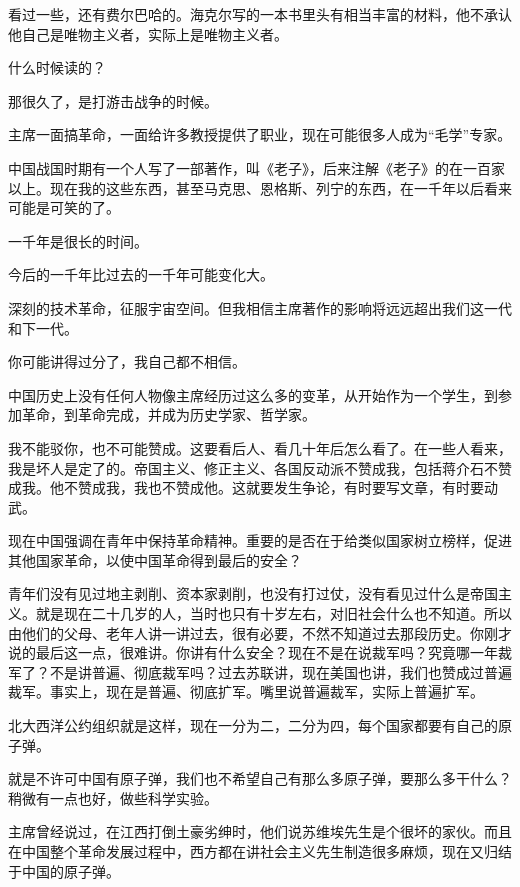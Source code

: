 看过一些，还有费尔巴哈的。海克尔写的一本书里头有相当丰富的材料，他不承认他自己是唯物主义者，实际上是唯物主义者。

什么时候读的？

那很久了，是打游击战争的时候。

主席一面搞革命，一面给许多教授提供了职业，现在可能很多人成为“毛学”专家。

中国战国时期有一个人写了一部著作，叫《老子》，后来注解《老子》的在一百家以上。现在我的这些东西，甚至马克思、恩格斯、列宁的东西，在一千年以后看来可能是可笑的了。

一千年是很长的时间。

今后的一千年比过去的一千年可能变化大。

深刻的技术革命，征服宇宙空间。但我相信主席著作的影响将远远超出我们这一代和下一代。

你可能讲得过分了，我自己都不相信。

中国历史上没有任何人物像主席经历过这么多的变革，从开始作为一个学生，到参加革命，到革命完成，并成为历史学家、哲学家。

我不能驳你，也不可能赞成。这要看后人、看几十年后怎么看了。在一些人看来，我是坏人是定了的。帝国主义、修正主义、各国反动派不赞成我，包括蒋介石不赞成我。他不赞成我，我也不赞成他。这就要发生争论，有时要写文章，有时要动武。

现在中国强调在青年中保持革命精神。重要的是否在于给类似国家树立榜样，促进其他国家革命，以使中国革命得到最后的安全？

青年们没有见过地主剥削、资本家剥削，也没有打过仗，没有看见过什么是帝国主义。就是现在二十几岁的人，当时也只有十岁左右，对旧社会什么也不知道。所以由他们的父母、老年人讲一讲过去，很有必要，不然不知道过去那段历史。你刚才说的最后这一点，很难讲。你讲有什么安全？现在不是在说裁军吗？究竟哪一年裁军了？不是讲普遍、彻底裁军吗？过去苏联讲，现在美国也讲，我们也赞成过普遍裁军。事实上，现在是普遍、彻底扩军。嘴里说普遍裁军，实际上普遍扩军。

北大西洋公约组织就是这样，现在一分为二，二分为四，每个国家都要有自己的原子弹。

就是不许可中国有原子弹，我们也不希望自己有那么多原子弹，要那么多干什么？稍微有一点也好，做些科学实验。

主席曾经说过，在江西打倒土豪劣绅时，他们说苏维埃先生是个很坏的家伙。而且在中国整个革命发展过程中，西方都在讲社会主义先生制造很多麻烦，现在又归结于中国的原子弹。

